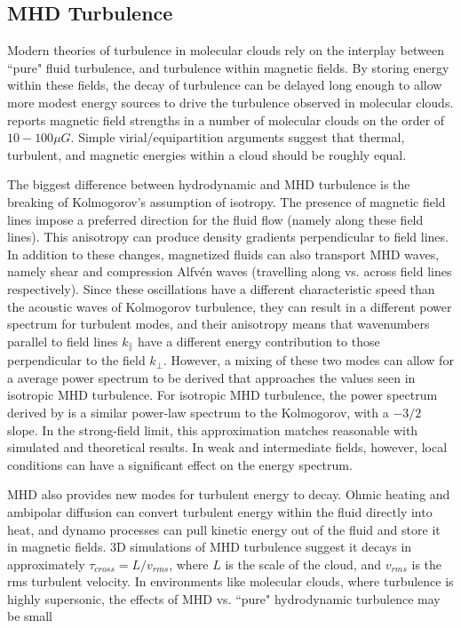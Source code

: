 \documentclass[12pt, preprint]{aastex}
\begin{document}
\subsection{MHD Turbulence}
Modern theories of turbulence in molecular clouds rely on the interplay between
``pure" fluid turbulence, and turbulence within magnetic fields.  By storing
energy within these fields, the decay of turbulence can be delayed long enough
to allow more modest energy sources to drive the turbulence observed in
molecular clouds.  \citet{shu1987} reports magnetic field strengths in a number
of molecular clouds on the order of $10-100 \mu G$.  Simple virial/equipartition
arguments suggest that thermal, turbulent, and magnetic energies within a cloud
should be roughly equal.

The biggest difference between hydrodynamic and MHD turbulence is the breaking
of Kolmogorov's assumption of isotropy.  The presence of magnetic field lines
impose a preferred direction for the fluid flow (namely along these field
lines).  This anisotropy can produce density gradients perpendicular to field
lines.  In addition to these changes, magnetized fluids can also transport MHD
waves, namely shear and compression Alfv\'{e}n waves (travelling along vs.
across field lines respectively).  Since these oscillations have a different
characteristic speed than the acoustic waves of Kolmogorov turbulence, they can
result in a different power spectrum for turbulent modes, and their anisotropy
means that wavenumbers parallel to field lines $k_\parallel$ have a different
energy contribution to those perpendicular to the field $k_\perp$.  However, a
mixing of these two modes can allow for a average power spectrum to be derived
that approaches the values seen in isotropic MHD turbulence.  For
isotropic MHD turbulence, the power spectrum derived by \citet{irosh1964} is a
similar power-law spectrum to the Kolmogorov, with a $-3/2$ slope.  In the
strong-field limit, this approximation matches reasonable with simulated and
theoretical results.  In weak and intermediate fields, however, local conditions
can have a significant effect on the energy spectrum.  

MHD also provides new modes for turbulent energy to decay.  Ohmic heating and
ambipolar diffusion can convert turbulent energy within the fluid directly into
heat, and dynamo processes can pull kinetic energy out of the fluid and store it
in magnetic fields.  3D simulations of MHD turbulence suggest it decays in
approximately $\tau_{cross} = L/v_{rms}$, where $L$ is the scale of the cloud,
and $v_{rms}$ is the rms turbulent velocity. In environments like molecular
clouds, where turbulence is highly supersonic, the effects of MHD vs. ``pure"
hydrodynamic turbulence may be small \citep{elm2004}
\end{document}
